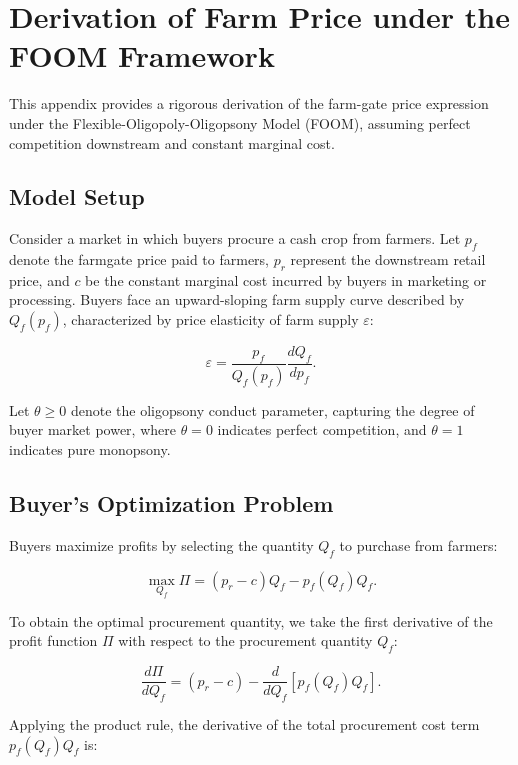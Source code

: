 \section{Derivation of Farm Price under the FOOM Framework} \label{Appendix: Derivation of Farm Price under the FOOM Framework}

This appendix provides a rigorous derivation of the farm-gate price expression under the Flexible-Oligopoly-Oligopsony Model (FOOM), assuming perfect competition downstream and constant marginal cost.

\subsection{Model Setup}

Consider a market in which buyers procure a cash crop from farmers. Let \( p_f \) denote the farmgate price paid to farmers, \( p_r \) represent the downstream retail price, and \( c \) be the constant marginal cost incurred by buyers in marketing or processing. Buyers face an upward-sloping farm supply curve described by \( Q_f(p_f) \), characterized by price elasticity of farm supply \( \varepsilon \):

\begin{equation}
\varepsilon = \frac{p_f}{Q_f(p_f)} \frac{dQ_f}{dp_f}.
\end{equation}

Let \( \theta \geq 0 \) denote the oligopsony conduct parameter, capturing the degree of buyer market power, where \( \theta = 0 \) indicates perfect competition, and \( \theta = 1 \) indicates pure monopsony.

\subsection{Buyer's Optimization Problem}

Buyers maximize profits by selecting the quantity \( Q_f \) to purchase from farmers:

\begin{equation}
\max_{Q_f} \Pi = (p_r - c)Q_f - p_f(Q_f)Q_f.
\end{equation}


To obtain the optimal procurement quantity, we take the first derivative of the profit function \(\Pi\) with respect to the procurement quantity \(Q_f\):

\[
\frac{d\Pi}{dQ_f} = (p_r - c) - \frac{d}{dQ_f}\left[p_f(Q_f)Q_f\right].
\]

Applying the product rule, the derivative of the total procurement cost term \(p_f(Q_f)Q_f\) is:

